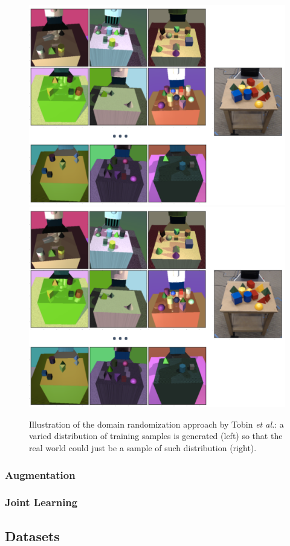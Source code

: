 \begin{figure}[!htb]
    \centering
    \includegraphics[width=0.55\linewidth, clip, trim=0 300 300 0]{Figures/Sim2Real/dr.png}
    \includegraphics[width=0.25\linewidth, clip, trim=720 200 0 0]{Figures/Sim2Real/dr.png}
    \caption{Illustration of the domain randomization approach by Tobin \emph{et al.}\cite{Tobin2017}: a varied distribution of training samples is generated (left) so that the real world could just be a sample of such distribution (right).}
    \label{fig:sim2real:dr}
\end{figure}

\clearpage

\subsubsection{Augmentation}


\subsubsection{Joint Learning}


\subsection{Datasets}

